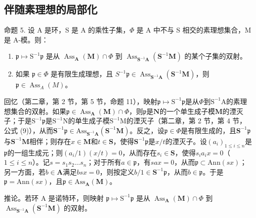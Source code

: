 \subsection{伴随素理想的局部化}

命题 5. 设 A 是环，S 是 A 的乘性子集，\(\Phi\) 是 A 中不与 S 相交的素理想集合，M 是 A-模。则：

\begin{enumerate}
\def\labelenumi{(\roman{enumi})}
\item
  \(\mathfrak{p} \mapsto \mathrm{S}^{-1}\mathfrak{p}\) 是从 \(\operatorname{Ass}_{\mathbf{A}}(\mathbf{M}) \cap \Phi\) 到 \(\operatorname{Ass}_{\mathbf{S}^{-1}\mathbf{A}}(\mathbf{S}^{-1}\mathbf{M})\) 的某个子集的双射。
\item
  如果 \(\mathfrak{p} \in \Phi\) 是有限生成理想，且 \(S^{-1}\mathfrak{p} \in \operatorname{Ass}_{\mathbf{S}^{-1}\mathbf{A}}(\mathbf{S}^{-1}\mathbf{M})\)，则 \(\mathfrak{p} \in \operatorname{Ass}_A(M)\)。
\end{enumerate}

回忆（第二章，第 2 节，第 5 节，命题 11），映射\(\mathfrak{p} \mapsto \mathrm{S}^{-1}\mathfrak{p}\)是从\(\Phi\)到\(\mathrm{S}^{-1}\mathrm{A}\)的素理想集合的双射。如果\(\mathfrak{p} \in \operatorname{Ass}_{\mathbf{A}}(\mathbf{M}) \cap \Phi\)，则\(\mathfrak{p}\)是\(\mathbf{N}\)的一个单生成子模\(\mathbf{M}\)的湮灭子；于是\(\mathrm{S}^{-1}\mathfrak{p}\)是\(\mathrm{S}^{-1}\mathrm{N}\)的单生成子模\(\mathrm{S}^{-1}\mathrm{M}\)的湮灭子（第二章，第 2 节，第 4 节，公式 (9)），从而\(\mathbf{S}^{-1}\mathfrak{p}\in\mathrm{Ass}_{\mathbf{S}^{-1}\mathbf{A}}(\mathbf{S}^{-1}\mathbf{M})\)。反之，设\(\mathfrak{p}\in\Phi\)是有限生成的，且\(\mathbf{S}^{-1}\mathfrak{p}\)与\(\mathbf{S}^{-1}\mathbf{M}\)相伴；则存在\(x\in\mathbf{M}\)和\(t\in\mathbf{S}\)，使得\(\mathbf{S}^{-1}\mathfrak{p}\)是\(x/t\)的湮灭子。设\((a_{i})_{1\leqslant i\leqslant n}\)是\(\mathfrak{p}\)的一组生成元；则\((a_{i}/1)(x/t)=0\)，从而存在\(s_{i}\in\mathbf{S}\)，使得\(s_{i}a_{i}x=0\)（\(1\leqslant i\leqslant n\)）。记\(s=s_{1}s_{2}\ldots s_{n}\)；对于所有\(a\in\mathfrak{p}\)，有\(sax=0\)，从而\(\mathfrak{p}\subset\mathrm{Ann}(sx)\)；另一方面，若\(b\in\mathbf{A}\)满足\(bsx=0\)，则按定义\(b/1\in\mathbf{S}^{-1}\mathfrak{p}\)，从而\(b\in\mathfrak{p}\)。于是\(\mathfrak{p}=\mathrm{Ann}(sx)\)，且\(\mathfrak{p}\in\mathrm{Ass}_{\mathbf{A}}(\mathbf{M})\)。

推论。若环 A 是诺特环，则映射 \(\mathfrak{p} \mapsto \mathrm{S}^{-1}\mathfrak{p}\) 是从 \(\operatorname{Ass}_{\mathbf{A}}(\mathbf{M}) \cap \Phi\) 到 \(\operatorname{Ass}_{\mathbf{S}^{-1}\mathbf{A}}(\mathbf{S}^{-1}\mathbf{M})\) 的双射。


